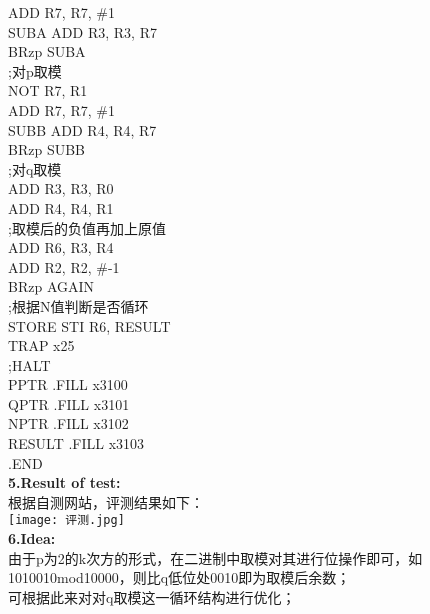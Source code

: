 \documentclass[12pt]{ctexart}
\begin{document}
\hspace*{1.5cm}ADD R7, R7, \#1\\
SUBA  ADD R3, R3, R7\\
\hspace*{1.5cm}BRzp SUBA\\
\hspace*{1.5cm};对p取模\\
\hspace*{1.5cm}NOT R7, R1\\
\hspace*{1.5cm}ADD R7, R7, \#1\\
SUBB  ADD R4, R4, R7\\
\hspace*{1.5cm}BRzp SUBB\\
\hspace*{1.5cm};对q取模\\
\hspace*{1.5cm}ADD R3, R3, R0\\
\hspace*{1.5cm}ADD R4, R4, R1\\
\hspace*{1.5cm};取模后的负值再加上原值\\
\hspace*{1.5cm}ADD R6, R3, R4\\
\hspace*{1.5cm}ADD R2, R2, \#-1\\
\hspace*{1.5cm}BRzp AGAIN\\
\hspace*{1.5cm};根据N值判断是否循环\\
STORE STI R6, RESULT\\
\hspace*{1.5cm}TRAP x25\\
\hspace*{1.5cm};HALT\\
\hspace*{1.5cm}PPTR    .FILL   x3100\\
\hspace*{1.5cm}QPTR    .FILL   x3101\\
\hspace*{1.5cm}NPTR    .FILL   x3102\\
\hspace*{1.5cm}RESULT     .FILL   x3103\\
\hspace*{1.5cm}.END\\
{\bf5.Result of test:}\\
根据自测网站，评测结果如下：\\
\texttt{[image: 评测.jpg]}\\
{\bf6.Idea:}\\
由于p为2的k次方的形式，在二进制中取模对其进行位操作即可，如1010010mod10000，则比q低位处0010即为取模后余数；\\
可根据此来对对q取模这一循环结构进行优化；
\end{document}
